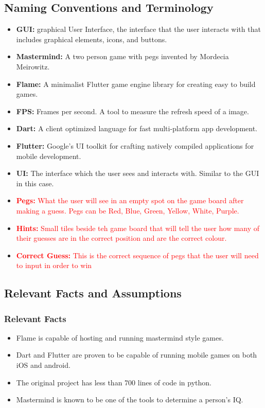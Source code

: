 \documentclass[12pt, titlepage]{article}
\begin{document}
\subsection{Naming Conventions and Terminology}
\begin{itemize}
    \item \textbf{GUI:} graphical User Interface, the interface that the user interacts with that includes graphical elements, icons, and buttons.
    \item \textbf{Mastermind:} A two person game with pegs invented by Mordecia Meirowitz.
    \item \textbf{Flame:} A minimalist Flutter game engine library for creating easy to build games.
    \item \textbf{FPS:} Frames per second. A tool to measure the refresh speed of a image.
    \item \textbf{Dart:} A client optimized language for fast multi-platform app development.
    \item \textbf{Flutter:} Google’s UI toolkit for crafting natively compiled applications for mobile development. 
    \item \textbf{UI:} The interface which the user sees and interacts with. Similar to the GUI in this case.
    \item \textcolor{red}{\textbf{Pegs:} What the user will see in an empty spot on the game board after making a guess. Pegs can be Red, Blue, Green, Yellow, White, Purple.}
    \item \textcolor{red}{\textbf{Hints:} Small tiles beside teh game board that will tell the user how many of their guesses are in the correct position and are the correct colour.}
    \item \textcolor{red}{\textbf{Correct Guess:} This is the correct sequence of pegs that the user will need to input in order to win}

\end{itemize}

\subsection{Relevant Facts and Assumptions}
\subsubsection{Relevant Facts}
\begin{itemize}
    \item Flame is capable of hosting and running mastermind style games.
    \item Dart and Flutter are proven to be capable of running mobile games on both iOS and android.
    \item The original project has less than 700 lines of code in python.
    \item Mastermind is known to be one of the tools to determine a person's IQ.
\end{itemize}
\end{document}
